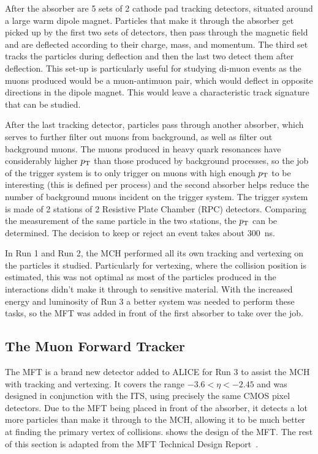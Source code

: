 After the absorber are 5 sets of 2 cathode pad tracking detectors, situated around a large warm dipole magnet. Particles that make it through the absorber get picked up by the first two sets of detectors, then pass through the magnetic field and are deflected according to their charge, mass, and momentum. The third set tracks the particles during deflection and then the last two detect them after deflection. This set-up is particularly useful for studying di-muon events as the muons produced would be a muon-antimuon pair, which would deflect in opposite directions in the dipole magnet. This would leave a characteristic track signature that can be studied.

After the last tracking detector, particles pass through another absorber, which serves to further filter out muons from background, as well as filter out background muons. The muons produced in heavy quark resonances have considerably higher $p_\mathrm{T}$ than those produced by background processes, so the job of the trigger system is to only trigger on muons with high enough $p_\mathrm{T}$ to be interesting (this is defined per process) and the second absorber helps reduce the number of background muons incident on the trigger system. The trigger system is made of 2 stations of 2 Resistive Plate Chamber (RPC) detectors. Comparing the measurement of the same particle in the two stations, the $p_\mathrm{T}$ can be determined. The decision to keep or reject an event takes about \SI{300}{\nano\second}.

In Run 1 and Run 2, the MCH performed all its own tracking and vertexing on the particles it studied. Particularly for vertexing, where the collision position is estimated, this was not optimal as most of the particles produced in the interactions didn't make it through to sensitive material. With the increased energy and luminosity of Run 3 a better system was needed to perform these tasks, so the MFT was added in front of the first absorber to take over the job.


\subsection{The Muon Forward Tracker}
The MFT is a brand new detector added to ALICE for Run 3 to assist the MCH with tracking and vertexing. It covers the range $-3.6<\eta<-2.45$ and was designed in conjunction with the ITS, using precisely the same CMOS pixel detectors. Due to the MFT being placed in front of the absorber, it detects a lot more particles than make it through to the MCH, allowing it to be much better at finding the primary vertex of collisions.  shows the design of the MFT. The rest of this section is adapted from the MFT Technical Design Report~\cite{MFT_TDR}. 

